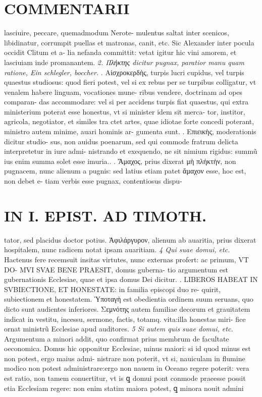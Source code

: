 \documentclass{article}
\begin{document}
\begin{pages}
\section*{COMMENTARII }
\marginpar{[ p.66 ]}\pstart lasciuire, peccare, quemadmodum Nerote- mulentus saltat inter scenicos, libidinatur, corrumpit puellas et matronas, canit, etc. Sic Alexander inter pocula occidit Clitum et a- lia nefanda committit: vetat igitur hic vini amorem, et lasciuiam inde promanantem.  \pend
\textit{2. Πλήκτης dicitur pugnax, paratior manu quam ratione, Ein schlegler, boccher. }. Αἰσχροκερδὴς, turpis lucri cupidus, vel turpis quaestus studiosus: quod fieri potest, vel si ex rebus per se turpibus colligatur, vt venalem habere linguam, vocationes mune- ribus vendere, doctrinam ad opes comparan- das accommodare: vel si per accidens turpis fiat quaestus, qui extra ministerium poterat esse honestus, vt si minister idem sit merca- tor, institor, agricola, negotiator, et similes tra ctet artes, quae idiotae forte concedi poterant, ministro autem minime, auari hominis ar- gumenta sunt.  \pend{}. Επιεικὴς, moderationis dicitur studio- sus, non auidus poenarum, sed qui commode fratrum delicta interpretetur in iure admi- nistrando et exequendo, ne sit nimium rigidus: summũ ius enim summa solet esse imuria..  \pend{}. Ἄμαχος, prius dixerat μὴ πλήκτὴν, non pugnacem, nunc alienum a pugnis: sed latius etiam patet ἄμαχον esse, hoc est, non debet e- tiam verbis esse pugnax, contentiosus dispu-  \pend
\section*{IN I. EPIST. AD TIMOTH. }
\marginpar{[ p.67 ]}\pstart tator, sed placidus doctor potius.  \pend{} Ἀφιλάργυρον, alienum ab auaritia, prius dixerat hospitalem, nunc radicem notat ipsam auaritiam.  \pend
\textit{4 Qui suae domui, etc. }\pstart Hactenus fere recemsuit insitas virtutes, nunc externas profert: ac primum, VT DO- MVI SVAE BENE PRAESIT, domus guberna- tio argumentum est gubernationis Ecclesiae, quae et ipsa domus Dei dicitur.  \pend{}. LIBEROS HABEAT IN SVBIECTIONE, ET HONESTATE: in familia episcopi duo re- quirit, subiectionem et honestatem. Ὑποταγὴ est obedientia ordinem suum seruans, quo dicto sunt audientes inferiores. Σεμνότης autem familiae decorum et grauitatem indicat in vestitu, incessu, sermone, factis, totamq. vita:illa honestas miri- fice ornat ministrũ Ecclesiae apud auditores.  \pend
\textit{5 Si autem quis suae domui, etc. }\pstart Argumentum a minori addit, quo confirmat prius membrum de facultate oeconomica. Domus hic opponitur Ecclesiae, minus maiori: si id quod minus est non potest, ergo maius admi- nistrare non poterit, vt si, nauiculam in flumine modico non potest administrare:ergo non nauem in Oceano regere poterit: vera est ratio, non tamem conuertitur, vt is ꝗ domui pont conmode praeesse possit etia Ecclesiam regere: non enim statim maiora potest, ꝗ minora nouit admini  \pend

\end{pages}
\end{document}
